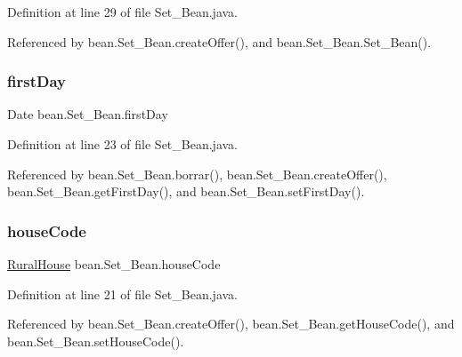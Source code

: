 Definition at line 29 of file Set\+\_\+\+Bean.\+java.



Referenced by bean.\+Set\+\_\+\+Bean.\+create\+Offer(), and bean.\+Set\+\_\+\+Bean.\+Set\+\_\+\+Bean().

\mbox{\label{classbean_1_1Set__Bean_a5f403451f5e63a57aa62d0ea72fb020b}} 
\subsubsection{\texorpdfstring{firstDay}{firstDay}}
{\footnotesize\ttfamily Date bean.\+Set\+\_\+\+Bean.\+first\+Day\hspace{0.3cm}{\ttfamily [private]}}



Definition at line 23 of file Set\+\_\+\+Bean.\+java.



Referenced by bean.\+Set\+\_\+\+Bean.\+borrar(), bean.\+Set\+\_\+\+Bean.\+create\+Offer(), bean.\+Set\+\_\+\+Bean.\+get\+First\+Day(), and bean.\+Set\+\_\+\+Bean.\+set\+First\+Day().

\mbox{\label{classbean_1_1Set__Bean_a80c8bf1baec6aa3305f06e8f34c4905d}} 
\subsubsection{\texorpdfstring{houseCode}{houseCode}}
{\footnotesize\ttfamily \mbox{\hyperlink{classdomain_1_1RuralHouse}{Rural\+House}} bean.\+Set\+\_\+\+Bean.\+house\+Code\hspace{0.3cm}{\ttfamily [private]}}



Definition at line 21 of file Set\+\_\+\+Bean.\+java.



Referenced by bean.\+Set\+\_\+\+Bean.\+create\+Offer(), bean.\+Set\+\_\+\+Bean.\+get\+House\+Code(), and bean.\+Set\+\_\+\+Bean.\+set\+House\+Code().

\mbox{\label{classbean_1_1Set__Bean_af99beccb4531fab9e9e96b5277ea4b6c}} 
